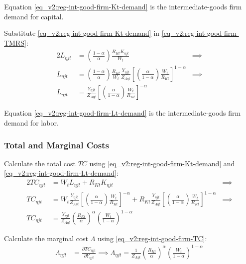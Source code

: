 \documentclass[../thesis.tex]{subfiles}
\begin{document}
Equation \ref{eq_v2:reg-int-good-firm-Kt-demand} is the intermediate-goods firm demand for capital. 

Substitute \ref{eq_v2:reg-int-good-firm-Kt-demand} in \ref{eq_v2:reg-int-good-firm-TMRS}:
\begin{alignat}{2}
	L_{\eta jt} & = \left( \frac{1-{\alpha_{}}}{{\alpha_{}}} \right) \frac{R_{Kt} K_{\eta jt}}{W_t} &\implies \nonumber \\
	L_{\eta jt} & = \left( \frac{1-{\alpha_{}}}{{\alpha_{}}} \right) \frac{R_{Kt}}{W_t} \frac{Y_{\eta jt}}{Z_{A\eta t}} \left[ \left( \frac{{\alpha_{}}}{1-{\alpha_{}}} \right) \frac{W_t}{R_{Kt}}\right]^{1-{\alpha_{}}} &\implies \nonumber \\
	L_{\eta jt} & = \frac{Y_{\eta jt}}{Z_{A\eta t}} \left[ \left( \frac{{\alpha_{}}}{1-{\alpha_{}}} \right) \frac{W_t}{R_{Kt}}\right]^{-{\alpha_{}}} \label{eq_v2:reg-int-good-firm-Lt-demand}
\end{alignat}

Equation \ref{eq_v2:reg-int-good-firm-Lt-demand} is the intermediate-goods firm demand for labor.

\subsubsection*{Total and Marginal Costs}

Calculate the total cost $TC$ using \ref{eq_v2:reg-int-good-firm-Kt-demand} and \ref{eq_v2:reg-int-good-firm-Lt-demand}:
\begin{alignat}{2}
	TC_{\eta jt} & = W_t L_{\eta jt} + R_{Kt} K_{\eta jt} &\implies \nonumber \\
	TC_{\eta jt} & = W_t \frac{Y_{\eta jt}}{Z_{A\eta t}} \left[ \left( \frac{{\alpha_{}}}{1-{\alpha_{}}} \right) \frac{W_t}{R_{Kt}} \right]^{-{\alpha_{}}} + R_{Kt} \frac{Y_{\eta jt}}{Z_{A\eta t}} \left[ \left( \frac{{\alpha_{}}}{1-{\alpha_{}}} \right) \frac{W_t}{R_{Kt}} \right]^{1-{\alpha_{}}} &\implies \nonumber \\
	TC_{\eta jt} & = \frac{Y_{\eta jt}}{Z_{A\eta t}} \left( \frac{R_{Kt}}{{\alpha_{}}} \right)^{{\alpha_{}}} \left( \frac{W_t}{1-{\alpha_{}}} \right)^{1-{\alpha_{}}} \label{eq_v2:reg-int-good-firm-TC}
\end{alignat}


Calculate the marginal cost $\Lambda$ using \ref{eq_v2:reg-int-good-firm-TC}: 
\begin{align}
	\Lambda_{\eta jt} & = \frac{\partial TC_{\eta jt}}{\partial Y_{\eta jt}} \implies 
	\Lambda_{\eta jt} = \frac{1}{Z_{A\eta t}} \left( \frac{R_{Kt}}{{\alpha_{}}} \right)^{{\alpha_{}}} \left( \frac{W_t}{1-{\alpha_{}}} \right)^{1-{\alpha_{}}} \label{eq_v2:reg-int-good-firm-MC}
\end{align}
\end{document}
